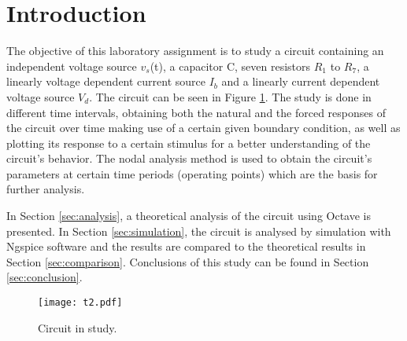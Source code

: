 \section{Introduction}
\label{sec:introduction}

The objective of this laboratory assignment is to study a circuit containing an
independent voltage source $v_s$(t), a capacitor C, seven resistors $R_1$ to $R_7$, a linearly voltage dependent current source $I_b$ and a linearly current dependent voltage source $V_d$.
The circuit can be seen in Figure \ref{fig:t2}. The study is done in different time intervals, obtaining both the natural and the forced responses of the circuit over time making use of a certain given boundary condition, as well as plotting its response to a certain stimulus for a better understanding of the circuit's behavior. The nodal analysis method is used to obtain the circuit's parameters at certain time periods (operating points) which are the basis for further analysis. \par


In Section \ref{sec:analysis}, a theoretical analysis of the circuit using Octave is
presented. In Section \ref{sec:simulation}, the circuit is analysed by
simulation with Ngspice software and the results are compared to the theoretical results in Section \ref{sec:comparison}. Conclusions of this study can be found in
Section \ref{sec:conclusion}.

\begin{figure}[htp] \centering
\texttt{[image: t2.pdf]}
\caption{Circuit in study.}
\label{fig:t2}
\end{figure}
\FloatBarrier

